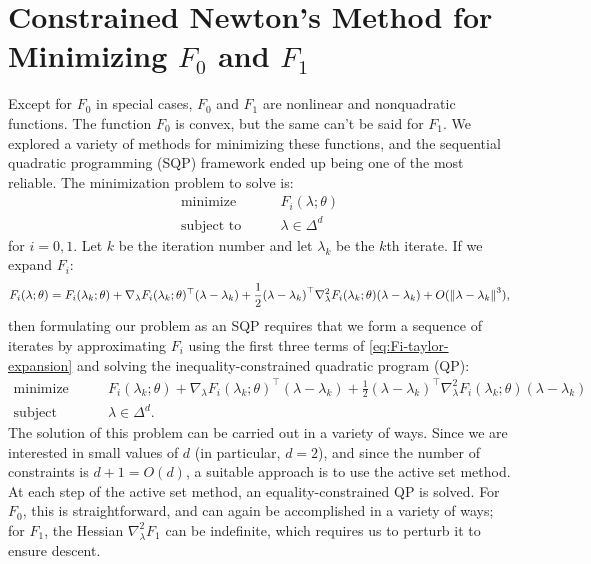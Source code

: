 \documentclass[eikonal.tex]{subfiles}
\begin{document}
\section{Constrained Newton's Method for Minimizing $F_0$ and
  $F_1$}\label{sec:constrained-newton}

Except for $F_0$ in special cases, $F_0$ and $F_1$ are nonlinear and
nonquadratic functions. The function $F_0$ is convex, but the same
can't be said for $F_1$. We explored a variety of methods for
minimizing these functions, and the sequential quadratic programming
(SQP) framework ended up being one of the most reliable. The
minimization problem to solve is:
\begin{align*}
  \mbox{minimize} & \qquad F_i(\lambda; \theta) \\
  \mbox{subject to} & \qquad \lambda \in \Delta^d
\end{align*}
for $i = 0, 1$. Let $k$ be the iteration number and let $\lambda_k$ be
the $k$th iterate. If we expand $F_i$:
\begin{align}\label{eq:Fi-taylor-expansion}
  F_i(\lambda; \theta) = F_i(\lambda_k; \theta) + \nabla_\lambda F_i(\lambda_k; \theta)^\top (\lambda - \lambda_k) + \frac{1}{2} {(\lambda - \lambda_k)}^\top \nabla_\lambda^2 F_i(\lambda_k; \theta) {(\lambda - \lambda_k)} + O(\left\|\lambda - \lambda_k\right\|^3),
\end{align}
then formulating our problem as an SQP requires that we form a
sequence of iterates by approximating $F_i$ using the first three
terms of \cref{eq:Fi-taylor-expansion} and solving the
inequality-constrained quadratic program (QP):
\begin{align*}
  \mbox{minimize} & \qquad F_i(\lambda_k; \theta) + \nabla_\lambda F_i(\lambda_k; \theta)^\top (\lambda - \lambda_k) + \frac{1}{2} {(\lambda - \lambda_k)}^\top \nabla_\lambda^2 F_i(\lambda_k; \theta) {(\lambda - \lambda_k)} \\
  \mbox{subject to} & \qquad \lambda \in \Delta^d.
\end{align*}
The solution of this problem can be carried out in a variety of
ways. Since we are interested in small values of $d$ (in particular,
$d = 2$), and since the number of constraints is $d + 1 = O(d)$, a
suitable approach is to use the active set method. At each step of the
active set method, an equality-constrained QP is solved. For $F_0$,
this is straightforward, and can again be accomplished in a variety of
ways; for $F_1$, the Hessian $\nabla_\lambda^2 F_1$ can be indefinite,
which requires us to perturb it to ensure descent.
\end{document}
